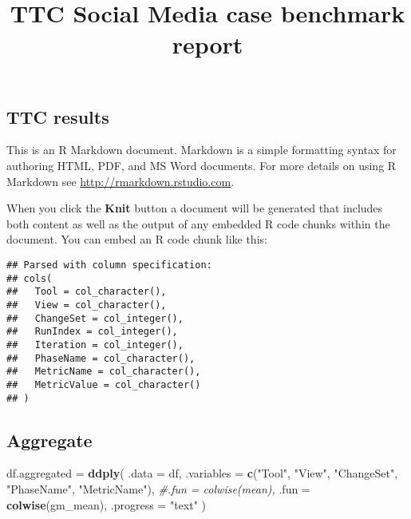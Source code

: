 \documentclass[a4paper]{article}
\title{TTC Social Media case benchmark report}
\author{}
\date{}
\newenvironment{Shaded}{\begin{snugshade}}{\end{snugshade}}
\newcommand{\KeywordTok}[1]{\textcolor[rgb]{0.13,0.29,0.53}{\textbf{#1}}}
\newcommand{\DataTypeTok}[1]{\textcolor[rgb]{0.13,0.29,0.53}{#1}}
\newcommand{\StringTok}[1]{\textcolor[rgb]{0.31,0.60,0.02}{#1}}
\newcommand{\CommentTok}[1]{\textcolor[rgb]{0.56,0.35,0.01}{\textit{#1}}}
\newcommand{\NormalTok}[1]{#1}
\begin{document}
\maketitle

\subsection{TTC results}\label{ttc-results}

This is an R Markdown document. Markdown is a simple formatting syntax
for authoring HTML, PDF, and MS Word documents. For more details on
using R Markdown see \url{http://rmarkdown.rstudio.com}.

When you click the \textbf{Knit} button a document will be generated
that includes both content as well as the output of any embedded R code
chunks within the document. You can embed an R code chunk like this:

\begin{verbatim}
## Parsed with column specification:
## cols(
##   Tool = col_character(),
##   View = col_character(),
##   ChangeSet = col_integer(),
##   RunIndex = col_integer(),
##   Iteration = col_integer(),
##   PhaseName = col_character(),
##   MetricName = col_character(),
##   MetricValue = col_character()
## )
\end{verbatim}

\subsection{Aggregate}\label{aggregate}

\begin{Shaded}
\begin{Highlighting}[]
\NormalTok{df.aggregated =}\StringTok{ }\KeywordTok{ddply}\NormalTok{(}
  \DataTypeTok{.data =}\NormalTok{ df,}
  \DataTypeTok{.variables =} \KeywordTok{c}\NormalTok{(}\StringTok{"Tool"}\NormalTok{, }\StringTok{"View"}\NormalTok{, }\StringTok{"ChangeSet"}\NormalTok{, }\StringTok{"PhaseName"}\NormalTok{, }\StringTok{"MetricName"}\NormalTok{),}
  \CommentTok{#.fun = colwise(mean),}
  \DataTypeTok{.fun =} \KeywordTok{colwise}\NormalTok{(gm_mean),}
  \DataTypeTok{.progress =} \StringTok{"text"}
\NormalTok{)}
\end{Highlighting}
\end{Shaded}
\end{document}
